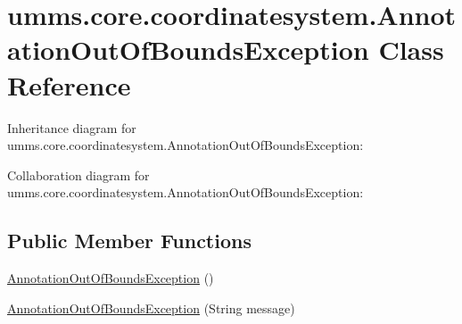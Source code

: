 \hypertarget{classumms_1_1core_1_1coordinatesystem_1_1_annotation_out_of_bounds_exception}{\section{umms.\+core.\+coordinatesystem.\+Annotation\+Out\+Of\+Bounds\+Exception Class Reference}
\label{classumms_1_1core_1_1coordinatesystem_1_1_annotation_out_of_bounds_exception}
}


Inheritance diagram for umms.\+core.\+coordinatesystem.\+Annotation\+Out\+Of\+Bounds\+Exception\+:


Collaboration diagram for umms.\+core.\+coordinatesystem.\+Annotation\+Out\+Of\+Bounds\+Exception\+:
\subsection*{Public Member Functions}
\begin{DoxyCompactItemize}
\item 
\hyperlink{classumms_1_1core_1_1coordinatesystem_1_1_annotation_out_of_bounds_exception_a5863f5a833b27f4d7541e871b8466324}{Annotation\+Out\+Of\+Bounds\+Exception} ()
\item 
\hyperlink{classumms_1_1core_1_1coordinatesystem_1_1_annotation_out_of_bounds_exception_a2fb714ce3e1ed57b23beb2cf323fbac9}{Annotation\+Out\+Of\+Bounds\+Exception} (String message)
\end{DoxyCompactItemize}


